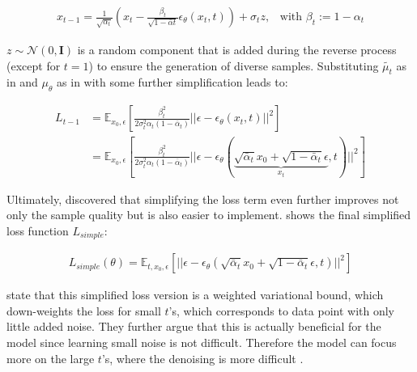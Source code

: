 \begin{equation}
  \begin{align*}
    \label{eqn:xt-1}
    x_{t-1} = \frac{1}{\sqrt{\alpha_t}}\left(x_t - \frac{\beta_t}{\sqrt{1-\bar{\alpha}t}}\epsilon_{\theta}(x_t,t)\right) + \sigma_t z \textrm{,}\quad
    \textrm{with } \beta_t := 1-\alpha_t
  \end{align*}
\end{equation}

\noindent $z\sim\mathcal{N}(0,\textbf{I})$ is a random component that is added during the reverse process (except for $t=1$) to ensure the generation of diverse samples.
\newpage
Substituting $\tilde{\mu_t}$ as in  and $\mu_\theta$ as in  with some further simplification leads to:

\begin{equation}
  \begin{align*}
    \label{eqn:eqn:lt-1_4}
    L_{t-1} &= \mathbb{E}_{x_0,\epsilon} \left[  \frac{\beta^2_t}{2\sigma_t^2 \alpha_t (1-\bar{\alpha}_t)} ||\epsilon - \epsilon_\theta(x_t,t)||^2 \right] \\
    &= \mathbb{E}_{x_0,\epsilon} \left[  \frac{\beta^2_t}{2\sigma_t^2 \alpha_t (1-\bar{\alpha}_t)} ||\epsilon - \epsilon_\theta( \underbrace{\sqrt{\bar{\alpha}_t} x_0 + \sqrt{1-\bar{\alpha}_t}\epsilon}_{x_t}, t)||^2 \right]
  \end{align*}
\end{equation}

Ultimately, \textcite[p. 5]{ho2020DenoisingDiffusionProbabilistic} discovered that simplifying the loss term even further improves not only the sample quality but is also easier to implement.
 shows the final simplified loss function $L_{simple}$:

\begin{equation}
  \begin{align*}
    \label{eqn:l_simple}
    L_{simple}(\theta) = \mathbb{E}_{t, x_0,\epsilon} \left[ ||\epsilon - \epsilon_\theta( \sqrt{\bar{\alpha}_t} x_0 + \sqrt{1-\bar{\alpha}_t}\epsilon, t)||^2 \right]
  \end{align*}
\end{equation}

\textcite{ho2020DenoisingDiffusionProbabilistic} state that this simplified loss version is a weighted variational bound, which down-weights the loss for small $t$'s, which corresponds to data point with only little added noise.
They further argue that this is actually beneficial for the model since learning small noise is not difficult. 
Therefore the model can focus more on the large $t$'s, where the denoising is more difficult \cite{ho2020DenoisingDiffusionProbabilistic}.

